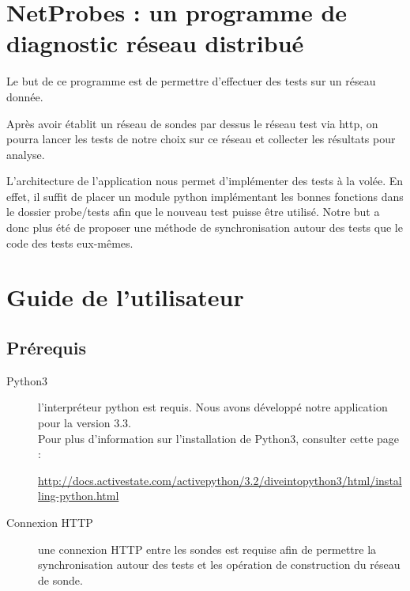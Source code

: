 \documentclass[a4paper,11pt]{article}
\begin{document}


\tableofcontents

\section{NetProbes : un programme de diagnostic réseau distribué}
Le but de ce programme est de permettre d'effectuer des tests sur un réseau donnée.

Après avoir établit un réseau de sondes par dessus le réseau test via http, on pourra lancer les tests de notre choix sur ce réseau et collecter les résultats pour analyse.

L'architecture de l'application nous permet d'implémenter des tests à la volée. En effet, il suffit de placer un module python implémentant les bonnes fonctions dans le dossier probe/tests afin que le nouveau test puisse être utilisé. Notre but a donc plus été de proposer une méthode de synchronisation autour des tests que le code des tests eux-mêmes.

\newpage
\section{Guide de l'utilisateur}

\subsection{Prérequis}
\begin{description}
\item[Python3] l'interpréteur python est requis. Nous avons développé notre application pour la version 3.3.\\
Pour plus d'information sur l'installation de Python3, consulter cette page :
\begin{center}
\href{http://docs.activestate.com/activepython/3.2/diveintopython3/html/installing-python.html}{http://docs.activestate.com/activepython/3.2/diveintopython3/html/installing-python.html}
\end{center}

\item[Connexion HTTP] une connexion HTTP entre les sondes est requise afin de permettre la synchronisation autour des tests et les opération de construction du réseau de sonde.
\end{description}
\end{document}
